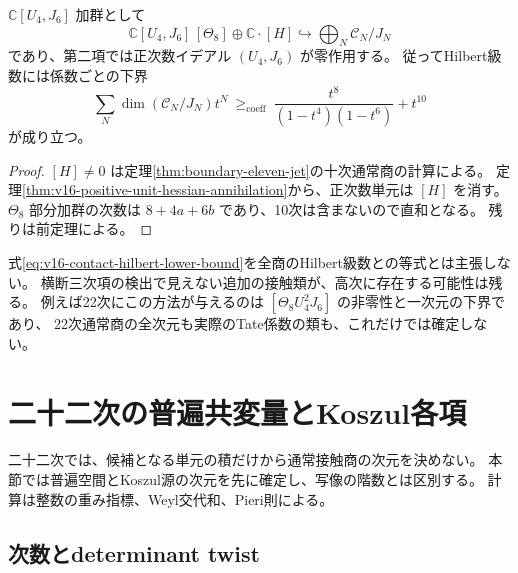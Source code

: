 \begin{corollary}[通常接触商の全次数Hilbert級数の下界]
\label{cor:v16-contact-hilbert-lower-bound}
$\mathbb C[U_4,J_6]$ 加群として
\[
 \mathbb C[U_4,J_6]\,[\Theta_8]\oplus\mathbb C\cdot[H]
 \hookrightarrow\bigoplus_N\mathcal C_N/J_N
\]
であり、第二項では正次数イデアル $(U_4,J_6)$ が零作用する。
従ってHilbert級数には係数ごとの下界
\begin{equation}\label{eq:v16-contact-hilbert-lower-bound}
 \sum_N\dim(\mathcal C_N/J_N)t^N
 \ \ge_{\mathrm{coeff}}\
 \frac{t^8}{(1-t^4)(1-t^6)}+t^{10}
\end{equation}
が成り立つ。
\end{corollary}

\begin{proof}
$[H]\ne0$ は定理\ref{thm:boundary-eleven-jet}の十次通常商の計算による。
定理\ref{thm:v16-positive-unit-hessian-annihilation}から、正次数単元は $[H]$ を消す。
$\Theta_8$ 部分加群の次数は $8+4a+6b$ であり、10次は含まないので直和となる。
残りは前定理による。
\end{proof}

\begin{remark}[下界と全商の同定を区別する]
式\eqref{eq:v16-contact-hilbert-lower-bound}を全商のHilbert級数との等式とは主張しない。
横断三次項の検出で見えない追加の接触類が、高次に存在する可能性は残る。
例えば22次にこの方法が与えるのは $[\Theta_8U_4^2J_6]$ の非零性と一次元の下界であり、
22次通常商の全次元も実際のTate係数の類も、これだけでは確定しない。
\end{remark}



\section{二十二次の普遍共変量とKoszul各項}
\label{sec:v16-characters}

二十二次では、候補となる単元の積だけから通常接触商の次元を決めない。
本節では普遍空間とKoszul源の次元を先に確定し、写像の階数とは区別する。
計算は整数の重み指標、Weyl交代和、Pieri則による。

\subsection{次数とdeterminant twist}

